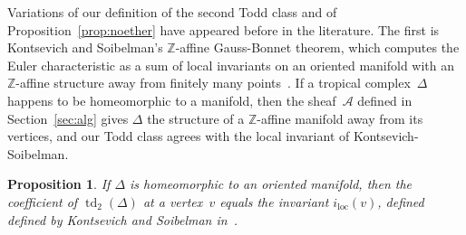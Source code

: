 \documentclass[11pt]{amsart}
\newtheorem{prop}[thm]{Proposition}
\theoremstyle{definition}
\newcommand{\cA}{\mathcal A}
\newcommand{\td}{\operatorname{td}}
\newcommand{\ZZ}{\mathbb Z}
\begin{document}
Variations of our definition of the second
Todd class and of Proposition~\ref{prop:noether} have appeared before in the
literature. The first is Kontsevich and Soibelman's
$\ZZ$-affine Gauss-Bonnet theorem, which computes
the Euler characteristic as a sum of local invariants on an oriented manifold
with an $\ZZ$-affine structure away from finitely many
points~\cite[Thm.~2]{kontsevich-soibelman}. If a tropical complex~$\Delta$
happens to be homeomorphic to a manifold, then the sheaf~$\cA$ defined in
Section~\ref{sec:alg} gives $\Delta$ the
structure of a $\ZZ$-affine manifold away from its vertices, and our Todd class
agrees with the local invariant of Kontsevich-Soibelman.

\begin{prop}
If $\Delta$ is homeomorphic to an oriented manifold, then the coefficient of
$\td_2(\Delta)$ at a vertex~$v$ equals the invariant $i_{\mathrm{loc}}(v)$,
defined defined by Kontsevich and Soibelman
in~\cite[Sec.~6.5]{kontsevich-soibelman}.
\end{prop}
\end{document}
